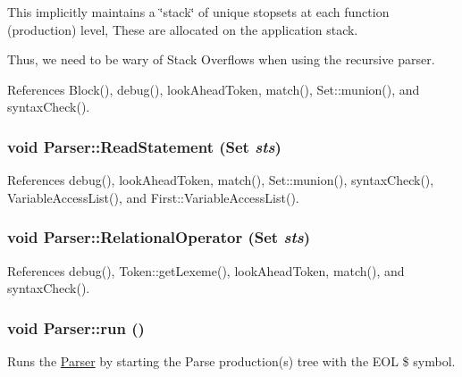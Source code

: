 This implicitly maintains a \char`\"{}stack\char`\"{} of unique stopsets at each function (production) level, These are allocated on the application stack.

Thus, we need to be wary of Stack Overflows when using the recursive parser. 

References Block(), debug(), lookAheadToken, match(), Set::munion(), and syntaxCheck().

\hypertarget{classParser_ac356b40bf99f68cc721b7e4ad2ebb67d}{
\subsubsection[{ReadStatement}]{\setlength{\rightskip}{0pt plus 5cm}void Parser::ReadStatement ({\bf Set} {\em sts})}}
\label{classParser_ac356b40bf99f68cc721b7e4ad2ebb67d}


References debug(), lookAheadToken, match(), Set::munion(), syntaxCheck(), VariableAccessList(), and First::VariableAccessList().

\hypertarget{classParser_ab68b61bab0a323b67457d520578cb853}{
\subsubsection[{RelationalOperator}]{\setlength{\rightskip}{0pt plus 5cm}void Parser::RelationalOperator ({\bf Set} {\em sts})}}
\label{classParser_ab68b61bab0a323b67457d520578cb853}


References debug(), Token::getLexeme(), lookAheadToken, match(), and syntaxCheck().

\hypertarget{classParser_a9e8d06d145f534e73a40b38e3f6711a0}{
\subsubsection[{run}]{\setlength{\rightskip}{0pt plus 5cm}void Parser::run ()}}
\label{classParser_a9e8d06d145f534e73a40b38e3f6711a0}


Runs the \hyperlink{classParser}{Parser} by starting the Parse production(s) tree with the EOL \$ symbol. 

